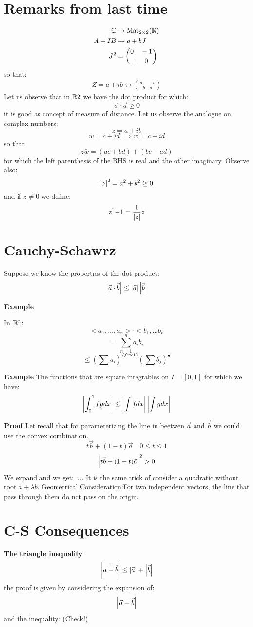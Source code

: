 \section{Remarks from last time}


\begin{align*}
\mathbb{C} &\rightarrow \textrm{Mat}_{2 \times 2} (\mathbb{R}) \\
A+IB &\rightarrow a + bJ \\
J^2 &= \binom{0 \quad -1}{1 \quad 0}
\end{align*}
so that:
\begin{align*}
Z = a+ ib \leftrightarrow \binom{a \quad -b}{b \quad a}
\end{align*}
Let us observe that in $ \mathbb{R}2 $ we have the dot product for which:
\[ \vec{a}\cdot \vec{a} \geq 0 \]
it is good as concept of measure of distance.
Let us observe the analogue on complex numbers:
\[ z = a+ib \]
\[ w = c+id \implies \bar{w} = c-id \]
so that 
\[ z\bar{w} = (ac + bd) + (bc -ad) \]
for which the left parenthesis of the RHS is real and the other imaginary. Observe also:
\[  \left| z \right|^2 = a^2 + b^2 \geq 0 \]
and if $z \neq 0 $ we define:
\[ z^"{-1} = \frac{1}{\left| z \right|} \bar{z} \]

\section*{Cauchy-Schawrz}
Suppose we know the properties of the dot product:
\[ \left| \vec{a} \cdot \vec{b} \right| \leq \left| \vec{a} \right|\left| \vec{b} \right|  \]

\textbf{Example}

In $\mathbb{R}^n $:
\[ <a_1, \ldots, a_n> \cdot < b_1, \ldots b_n \]
\[  = \sum_{n = 1}^{n} a_i b_i \]
\[  \leq (\sum a_i)^{/frac{1}{2}} (\sum b_j)^{\frac{1}{2}} \]

\textbf{Example}
The functions that are square integrables on $I = [0,1] $
for which we have:
\[ \left|  \int_{0}^{1} f g dx \right| \leq \left| \int f dx \right|  \left|  \int g dx \right|\]

\textbf{Proof}
Let recall that for parameterizing the line in beetwen $ \vec{a} $ and $ \vec{ b } $ we could use the convex  combination.
\[ t \vec{b} + (1-t) \vec{a} \quad 0 \leq t \leq 1 \]
\[  \left| t \vec{b} + (1-t) \vec{a} \right|^2 > 0 \]
We expand and we get:
.... It is the same trick of consider a quadratic without root $ a + \lambda b$.
Geometrical Consideration:For two independent vectors, the line that pass through them do not pass on the origin. 
\section{C-S Consequences}
\textbf{The triangle inequality}
\[  \left| \vec{a + \vec{b}} \right| \leq \left| \vec{a} \right| + \left|  \vec{b} \right|  \]
the proof is given by considering the expansion of:
\[  \left|  \vec{a} + \vec{b} \right| \]
and the inequality: (Check!)

